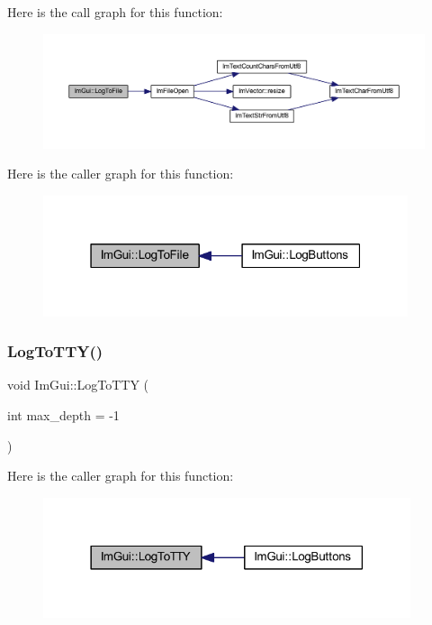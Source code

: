 Here is the call graph for this function\+:
\nopagebreak
\begin{figure}[H]
\begin{center}
\leavevmode
\includegraphics[width=350pt]{namespace_im_gui_ab62461a65c153b9f40842debef8aa755_cgraph}
\end{center}
\end{figure}
Here is the caller graph for this function\+:
\nopagebreak
\begin{figure}[H]
\begin{center}
\leavevmode
\includegraphics[width=304pt]{namespace_im_gui_ab62461a65c153b9f40842debef8aa755_icgraph}
\end{center}
\end{figure}
\mbox{\label{namespace_im_gui_a37696f5296f33ae4218f53b40b81cccc}} 
\subsubsection{\texorpdfstring{Log\+To\+T\+T\+Y()}{LogToTTY()}}
{\footnotesize\ttfamily void Im\+Gui\+::\+Log\+To\+T\+TY (\begin{DoxyParamCaption}\item[{int}]{max\+\_\+depth = {\ttfamily -\/1} }\end{DoxyParamCaption})}

Here is the caller graph for this function\+:
\nopagebreak
\begin{figure}[H]
\begin{center}
\leavevmode
\includegraphics[width=306pt]{namespace_im_gui_a37696f5296f33ae4218f53b40b81cccc_icgraph}
\end{center}
\end{figure}
\mbox{\label{namespace_im_gui_aee9b660c1d6786c00fc47c71c66eb1eb}} 
